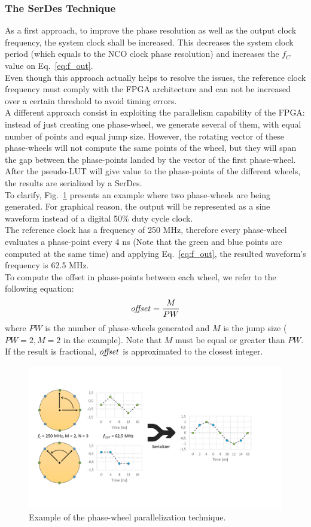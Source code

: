 \documentclass[11pt]{article}
\renewcommand{\>}{\rangle} \renewcommand{\emptyset}{\varnothing}
\begin{document}
\subsubsection{The SerDes Technique} \label{sec:the_serdes_technique} As a first
approach, to improve the phase resolution as well as the output clock frequency,
the system clock shall be increased. This decreases the system clock period
(which equals to the NCO clock phase resolution) and increases the $f_C$
value on Eq.~\ref{eq:f_out}.\\
Even though this approach actually helps to resolve the issues, the reference
clock frequency must comply with the FPGA architecture and can not be increased
over a certain threshold to avoid timing errors.\\
A different approach consist in exploiting the parallelism capability of the
FPGA: instead of just creating one phase-wheel, we generate several of them,
with equal number of points and equal jump size. However, the rotating vector of
these phase-wheels will not compute the same points of the wheel, but they will
span the gap between the phase-points landed by the vector of the first
phase-wheel. After the pseudo-LUT will give value to the phase-points of the
different
wheels, the results are serialized by a SerDes.\\
To clarify, Fig.~\ref{fig:nco_horizontal} presents an example where two
phase-wheels are being generated. For graphical reason, the output will be
represented as a sine waveform instead of a digital 50\% duty cycle clock.\\
The reference clock has a frequency of 250 MHz, therefore every phase-wheel
evaluates a phase-point every 4 ns (Note that the green and blue points are
computed at the same time) and applying Eq.~\ref{eq:f_out}, the resulted
waveform's frequency is 62.5 MHz.\\
To compute the offset in phase-points between each wheel, we refer to the
following equation:
\begin{equation}
  \text{\textit{offset}} = \frac{M}{PW}
  \label{eq:offset}
\end{equation}
where $PW$ is the number of phase-wheels generated and $M$ is the jump size ($PW
= 2, M = 2$ in the example). Note that $M$ must be equal or greater than $PW$.
If the result is fractional, $\text{\textit{offset}}$ is approximated to the
closest integer.
\begin{figure}[h]
  \centerline{\includegraphics[width=0.9\linewidth]{images/nco_horizontal}}
  \caption{Example of the phase-wheel parallelization technique.}
  \label{fig:nco_horizontal}
\end{figure}
\end{document}
